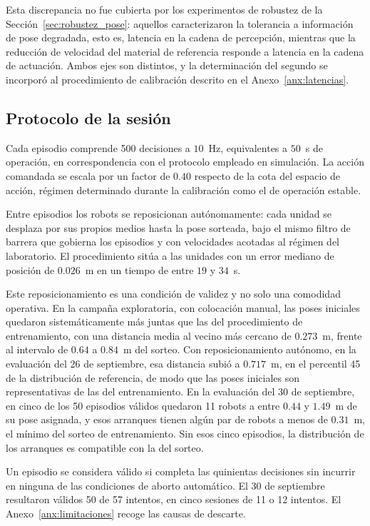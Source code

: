 Esta discrepancia no fue cubierta por los
experimentos de robustez de la Sección~\ref{sec:robustez_pose}: aquellos
caracterizaron la tolerancia a información de pose degradada, esto es, latencia
en la cadena de percepción, mientras que la reducción de velocidad del material
de referencia responde a latencia en la cadena de actuación. Ambos ejes son
distintos, y la determinación del segundo se incorporó al procedimiento de
calibración descrito en el Anexo~\ref{anx:latencias}.

\subsection*{Protocolo de la sesión}

Cada episodio comprende 500 decisiones a $10$~Hz, equivalentes a $50$~s de operación, en correspondencia con el protocolo empleado
en simulación. La acción comandada se escala por un factor de $0{.}40$ respecto
de la cota del espacio de acción, régimen determinado durante la calibración
como el de operación estable.

Entre episodios los robots se reposicionan autónomamente: cada unidad se
desplaza por sus propios medios hasta la pose sorteada, bajo el mismo filtro de
barrera que gobierna los episodios y con velocidades acotadas al régimen del
laboratorio. El procedimiento sitúa a las unidades con un error mediano de
posición de $0{.}026$~m en un tiempo de entre $19$ y $34$~s.

Este reposicionamiento es una condición de validez y no solo una comodidad operativa. En la campaña exploratoria, con colocación manual, las poses iniciales quedaron sistemáticamente más juntas que las del procedimiento de entrenamiento, con una distancia media al vecino más cercano de $0{.}273$~m, frente al intervalo de $0{.}64$ a $0{.}84$~m del sorteo. Con reposicionamiento autónomo, en la evaluación del 26 de septiembre, esa distancia subió a $0{.}717$~m, en el percentil 45 de la distribución de referencia, de modo que las poses iniciales son representativas de las del entrenamiento. En la evaluación del 30 de septiembre, en cinco de los 50 episodios válidos quedaron 11 robots a entre $0{.}44$ y $1{.}49$~m de su pose asignada, y esos arranques tienen algún par de robots a menos de $0{.}31$~m, el mínimo del sorteo de entrenamiento. Sin esos cinco episodios, la distribución de los arranques es compatible con la del sorteo.

Un episodio se considera válido si completa las quinientas decisiones sin
incurrir en ninguna de las condiciones de aborto automático. El 30 de septiembre resultaron válidos 50 de 57 intentos, en cinco sesiones de 11 o 12
intentos. El Anexo~\ref{anx:limitaciones} recoge las causas de descarte.

